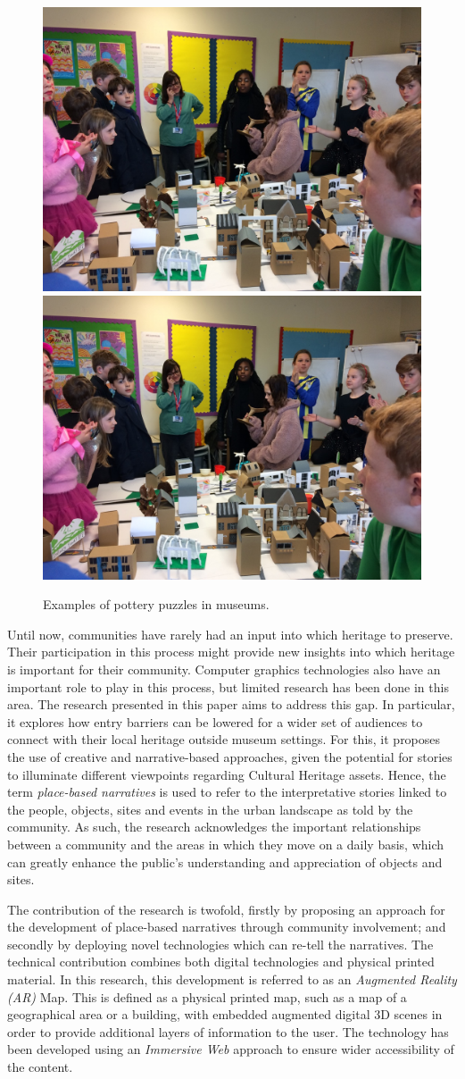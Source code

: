 \documentclass[acmlarge,screen,dvipsnames]{acmart}
\begin{document}
\begin{figure}[b]
  \centering
  {\includegraphics[width=0.35\linewidth]{images/IMG_7377}}
  \hspace{0.5in}
  {\includegraphics[width=0.35\linewidth]{images/IMG_7377}}
  \caption{\label{fig:puz}Examples of pottery puzzles in museums.}
\end{figure}

 Until now, communities have rarely had an input into which heritage to preserve.
Their participation in this process might provide new insights into which
heritage is important for their community. Computer graphics technologies also
have an important role to play in this process, but limited research has
been done in this area. The research presented in this paper aims to address
this gap. In particular, it explores how entry barriers can be lowered for a
wider set of audiences to connect with their local heritage outside museum
settings. For this, it proposes the use of creative and narrative-based
approaches, given the potential for stories to illuminate different viewpoints
regarding Cultural Heritage assets. Hence, the term \textit{place-based
narratives} is used to refer to the interpretative stories linked to the
people, objects, sites and events in the urban landscape as told by the
community. As such, the research acknowledges the important relationships
between a community and the areas in which they move on a daily basis, which
can greatly enhance the public's understanding and appreciation of objects and
sites. 

The contribution of the research is twofold, firstly by proposing an approach for
the development of place-based narratives through community involvement; and
secondly by deploying novel technologies which can re-tell the
narratives. The technical contribution combines both digital technologies and
physical printed material. In this research, this development is referred to
as an \emph{Augmented Reality (AR)} Map. This is defined as a physical printed
map, such as a map of a geographical area or a building, with embedded
augmented digital 3D scenes in order to provide additional layers of
information to the user. The technology has been developed using an
\emph{Immersive Web} approach to ensure wider accessibility of the content.
\end{document}

